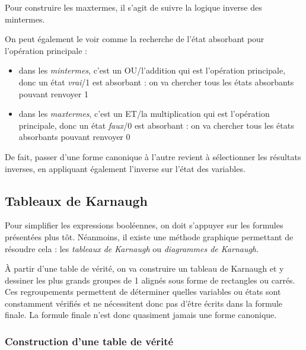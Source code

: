 \documentclass[11pt,a4paper]{article}
\begin{document}
\bigskip

Pour construire les maxtermes, il s'agit de suivre la logique inverse des mintermes.

\medskip

On peut également le voir comme la recherche de l'état absorbant pour l'opération principale :

\begin{itemize}
\item dans les \textit{mintermes}, c'est un OU/l'addition qui est l'opération principale, donc un état \linebreak \textit{vrai}/1 est absorbant : on va chercher tous les états absorbants pouvant renvoyer 1
\item dans les \textit{maxtermes}, c'est un ET/la multiplication qui est l'opération principale, donc un état \textit{faux}/0 est absorbant : on va chercher tous les états absorbants pouvant renvoyer 0
\end{itemize}

De fait, passer d'une forme canonique à l'autre revient à sélectionner les résultats inverses, en appliquant également l'inverse sur l'état des variables.


\medskip


\subsection{Tableaux de Karnaugh}

\medskip

Pour simplifier les expressions booléennes, on doit s'appuyer sur les formules présentées plus tôt.
Néanmoins, il existe une méthode graphique permettant de résoudre cela : les \textit{tableaux de Karnaugh} ou \textit{diagrammes de Karnaugh}.

\medskip

\`A partir d'une table de vérité, on va construire un tableau de Karnaugh et y dessiner les plus grands groupes de 1 alignés sous forme de rectangles ou carrés.
Ces regroupements permettent de déterminer quelles variables ou états sont constamment vérifiés et ne nécessitent donc pas d'être écrits dans la formule finale.
La formule finale n'est donc quasiment jamais une forme canonique.

\medskip


\subsubsection{Construction d'une table de vérité}
\end{document}
